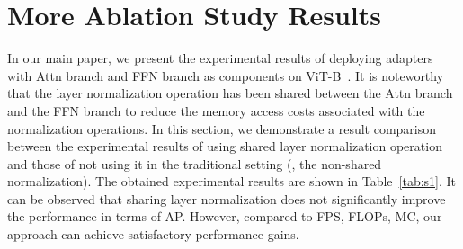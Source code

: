 \section{More Ablation Study Results}
\label{secS5}
{} In our main paper, we present the experimental results of deploying adapters with Attn branch and FFN branch as components on ViT-B~\citep{li2022exploring}. It is noteworthy that the layer normalization operation has been shared between the Attn branch and the FFN branch to reduce the memory access costs associated with the normalization operations. In this section, we demonstrate a result comparison between the experimental results of using shared layer normalization operation and those of not using it in the traditional setting (\ie, the non-shared normalization). The obtained experimental results are shown in Table~\ref{tab:s1}. It can be observed that sharing layer normalization does not significantly improve the performance in terms of AP. However, compared to FPS, FLOPs, MC, our approach can achieve satisfactory performance gains.
\begin{table*}[t]
\centering
\renewcommand\arraystretch{1.2}
\end{table*}

